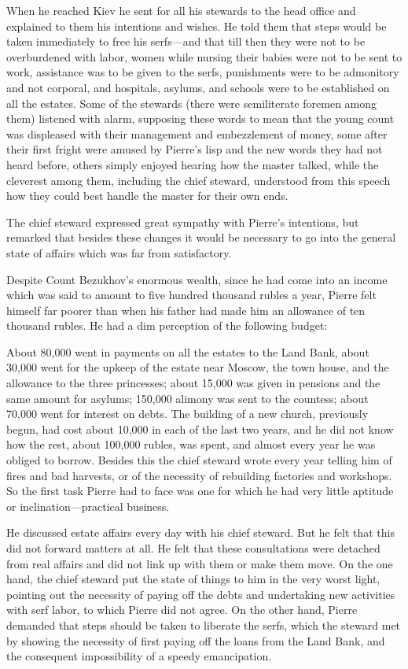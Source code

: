 When he reached Kiev he sent for all his stewards to the head
office and explained to them his intentions and wishes. He told
them that steps would be taken immediately to free his
serfs---and that till then they were not to be overburdened with
labor, women while nursing their babies were not to be sent to
work, assistance was to be given to the serfs, punishments were
to be admonitory and not corporal, and hospitals, asylums, and
schools were to be established on all the estates. Some of the
stewards (there were semiliterate foremen among them) listened
with alarm, supposing these words to mean that the young count
was displeased with their management and embezzlement of money,
some after their first fright were amused by Pierre's lisp and
the new words they had not heard before, others simply enjoyed
hearing how the master talked, while the cleverest among them,
including the chief steward, understood from this speech how they
could best handle the master for their own ends.

The chief steward expressed great sympathy with Pierre's
intentions, but remarked that besides these changes it would be
necessary to go into the general state of affairs which was far
from satisfactory.

Despite Count Bezukhov's enormous wealth, since he had come into
an income which was said to amount to five hundred thousand
rubles a year, Pierre felt himself far poorer than when his
father had made him an allowance of ten thousand rubles. He had a
dim perception of the following budget:

About 80,000 went in payments on all the estates to the Land
Bank, about 30,000 went for the upkeep of the estate near Moscow,
the town house, and the allowance to the three princesses; about
15,000 was given in pensions and the same amount for asylums;
150,000 alimony was sent to the countess; about 70,000 went for
interest on debts. The building of a new church, previously
begun, had cost about 10,000 in each of the last two years, and
he did not know how the rest, about 100,000 rubles, was spent,
and almost every year he was obliged to borrow. Besides this the
chief steward wrote every year telling him of fires and bad
harvests, or of the necessity of rebuilding factories and
workshops. So the first task Pierre had to face was one for which
he had very little aptitude or inclination---practical business.

He discussed estate affairs every day with his chief steward. But
he felt that this did not forward matters at all. He felt that
these consultations were detached from real affairs and did not
link up with them or make them move. On the one hand, the chief
steward put the state of things to him in the very worst light,
pointing out the necessity of paying off the debts and
undertaking new activities with serf labor, to which Pierre did
not agree. On the other hand, Pierre demanded that steps should
be taken to liberate the serfs, which the steward met by showing
the necessity of first paying off the loans from the Land Bank,
and the consequent impossibility of a speedy emancipation.

